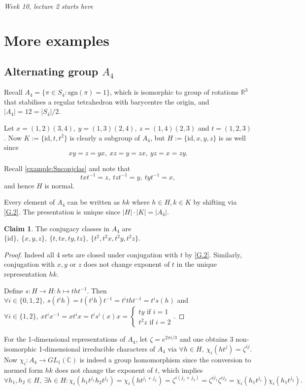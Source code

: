 \documentclass[a4paper]{article}
\newcommand{\sgn}{\text{sgn}}
\newcommand{\R}{\mathbb{R}}
\newcommand{\C}{\mathbb{C}}
\newcommand{\id}{\text{id}}
\theoremstyle{definition}
\newtheorem{claim}[defn]{Claim}
\begin{document}
\begin{flushright}
\textit{Week 10, lecture 2 starts here}
\end{flushright}

\section{More examples}
\subsection{Alternating group $A_4$}
Recall $A_4=\{\pi\in S_4:\sgn(\pi)=1\}$, which is isomorphic to group of rotations $\R^3$ that stabilises a regular tetrahedron with barycentre the origin, and $|A_4|=12=|S_4|/2$.

Let $x=(1,2)(3,4),\ y=(1,3)(2,4),\ z=(1,4)(2,3)$ and $t=(1,2,3)$. Now $K:=\{\id,t,t^2\}$ is clearly a subgroup of $A_4$, but $H:=\{\id,x,y,z\}$ is as well since
\[
\label{G.1}
\tag{G.1}
xy=z=yx,\ xz=y=zx,\ yz=x=zy.
\]

Recall \ref{example:Snconjclas} and note that
\[
\label{G.2}
\tag{G.2}
txt^{-1}=z,\ tzt^{-1}=y,\ tyt^{-1}=x,
\]
and hence $H$ is normal.

Every element of $A_4$ can be written as $hk$ where $h\in H,k\in K$ by shifting via \ref{G.2}. The presentation is unique since $|H|\cdot |K|=|A_4|$.

\begin{claim}
The conjugacy classes in $A_4$ are $\{\id\},\ \{x,y,z\},\ \{t,tx,ty,tz\},\ \{t^2,t^2x,t^2y,t^2z\}$.
\end{claim}
\begin{proof}
Indeed all 4 sets are closed under conjugation with $t$ by \ref{G.2}. Similarly, conjugation with $x,y$ or $z$ does not change exponent of $t$ in the unique representation $hk$.

Define $s:H\rightarrow H:h\mapsto tht^{-1}$. Then $\forall i\in\{0,1,2\},\ s(t^ih)=t(t^ih)t^{-1}=t^itht^{-1}=t^i s(h)$ and $\forall i\in\{1,2\},\ xt^ix^{-1}=xt^ix=t^is^i(x)x=\left\{ \begin{aligned}
  ty \text{ if }i=1 \\ t^2z\text{ if }i=2
\end{aligned} \right..$
\end{proof}

For the 1-dimensional representations of $A_4$, let $\zeta=e^{2\pi i/3}$ and one obtains 3 non-isomorphic 1-dimensional irreducible characters of $A_4$ via $\forall h\in H,\ \chi_i(ht^j)=\zeta^{ij}$. Now $\chi_i:A_4\rightarrow GL_1(\C)$ is indeed a group homomorphism since the conversion to normed form $hk$ does not change the exponent of $t$, which implies
\[
\forall h_1,h_2\in H,\ \exists h\in H:\chi_i(h_1t^{j_1}h_2t^{j_2})=\chi_i(ht^{j_1+j_2})=\zeta^{i(j_1+j_2)}=\zeta^{ij_1}\zeta^{ij_2}=\chi_i(h_1t^{j_1})\chi_i(h_1t^{j_2}).
\]
\end{document}
